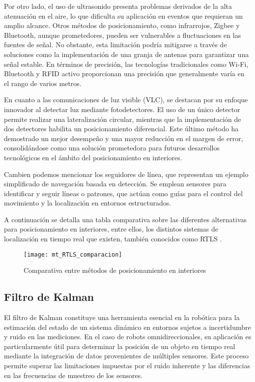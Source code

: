 Por otro lado, el uso de ultrasonido presenta problemas derivados de la alta atenuación en el aire, lo que dificulta su aplicación en eventos que requieran un amplio alcance. Otros métodos de posicionamiento, como infrarrojos, Zigbee y Bluetooth, aunque prometedores, pueden ser vulnerables a fluctuaciones en las fuentes de señal. No obstante, esta limitación podría mitigarse a través de soluciones como la implementación de una granja de antenas para garantizar una señal estable. En términos de precisión, las tecnologías tradicionales como Wi-Fi, Bluetooth y RFID activo proporcionan una precisión que generalmente varía en el rango de varios metros.

En cuanto a las comunicaciones de luz visible (VLC), se destacan por su enfoque innovador al detectar luz mediante fotodetectores. El uso de un único detector permite realizar una lateralización circular, mientras que la implementación de dos detectores habilita un posicionamiento diferencial. Este último método ha demostrado un mejor desempeño y una mayor reducción en el margen de error, consolidándose como una solución prometedora para futuros desarrollos tecnológicos en el ámbito del posicionamiento en interiores.

Cambien podemos mencionar los seguidores de línea, que representan un ejemplo simplificado de navegación basada en detección. Se emplean sensores para identificar y seguir líneas o patrones, que actúan como guías para el control del movimiento y la localización en entornos estructurados.

A continuación se detalla una tabla comparativa sobre las diferentes alternativas para posicionamiento en interiores, entre ellos, los distintos sistemas de localización en tiempo real que existen, también conocidos como RTLS \cite{alammarsurveyindoor}.

\begin{figure}[H]
    \centering
    \hspace*{-1.0cm}
    \texttt{[image: mt\_RTLS\_comparacion]}
    \caption{Comparativa entre métodos de posicionamiento en interiores}
    \label{fig:compmetposindor}
\end{figure}


\subsection{Filtro de Kalman}

El filtro de Kalman constituye una herramienta esencial en la robótica para la estimación del estado de un sistema dinámico en entornos sujetos a incertidumbre y ruido en las mediciones. En el caso de robots omnidireccionales, su aplicación es particularmente útil para determinar la posición de un objeto en tiempo real mediante la integración de datos provenientes de múltiples sensores. Este proceso permite superar las limitaciones impuestas por el ruido inherente y las diferencias en las frecuencias de muestreo de los sensores.

